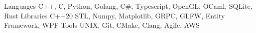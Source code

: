 


\begin{cvskills}


\cvskill
{Languages} %
{C++, C, Python, Golang, C\#, Typescript, OpenGL, OCaml, SQLite, Rust}
\cvskill
{Libraries}
{C++20 STL, Numpy, Matplotlib, GRPC, GLFW, Entity Framework, WPF}
\cvskill
{Tools}
{UNIX, Git, CMake, Clang, Agile, AWS}



\end{cvskills}